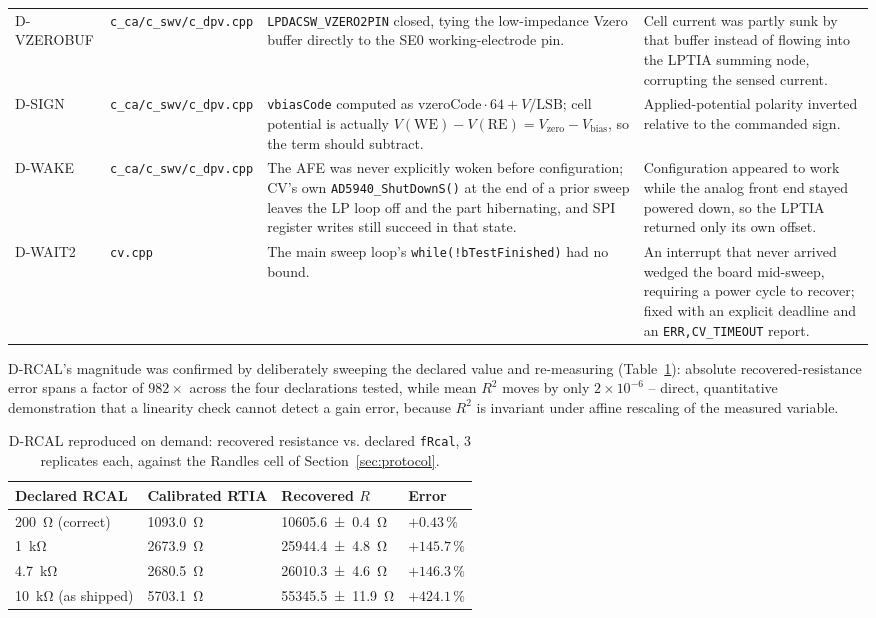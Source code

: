 \begin{table}[!t]
\begin{tabular}{@{}p{1.7cm}p{2.3cm}p{6.5cm}p{4.9cm}@{}}
D-VZEROBUF & \texttt{c\_ca/c\_swv/c\_dpv.cpp} & \texttt{LPDACSW\_VZERO2PIN}
  closed, tying the low-impedance Vzero buffer directly to the SE0
  working-electrode pin. & Cell current was partly sunk by that buffer
  instead of flowing into the LPTIA summing node, corrupting the sensed
  current. \\
D-SIGN & \texttt{c\_ca/c\_swv/c\_dpv.cpp} & \texttt{vbiasCode} computed as
  $\mathrm{vzeroCode}\cdot64+V/\mathrm{LSB}$; cell potential is actually
  $V(\mathrm{WE})-V(\mathrm{RE})=V_{\mathrm{zero}}-V_{\mathrm{bias}}$, so the
  term should subtract. & Applied-potential polarity inverted relative to
  the commanded sign. \\
D-WAKE & \texttt{c\_ca/c\_swv/c\_dpv.cpp} & The AFE was never explicitly
  woken before configuration; CV's own \texttt{AD5940\_ShutDownS()} at the
  end of a prior sweep leaves the LP loop off and the part hibernating,
  and SPI register writes still succeed in that state. & Configuration
  appeared to work while the analog front end stayed powered down, so the
  LPTIA returned only its own offset. \\
D-WAIT2 & \texttt{cv.cpp} & The main sweep loop's
  \texttt{while(!bTestFinished)} had no bound. & An interrupt that never
  arrived wedged the board mid-sweep, requiring a power cycle to recover;
  fixed with an explicit deadline and an \texttt{ERR,CV\_TIMEOUT} report. \\
\bottomrule
\end{tabular}
\end{table}

D-RCAL's magnitude was confirmed by deliberately sweeping the declared
value and re-measuring (Table~\ref{tab:rcalsweep}): absolute
recovered-resistance error spans a factor of $982\times$ across the four
declarations tested, while mean $R^2$ moves by only $2\times10^{-6}$ --
direct, quantitative demonstration that a linearity check cannot detect a
gain error, because $R^2$ is invariant under affine rescaling of the
measured variable.

\begin{table}[H]
\centering
\footnotesize
\setlength{\tabcolsep}{4pt}
\caption{D-RCAL reproduced on demand: recovered resistance vs. declared
\texttt{fRcal}, 3 replicates each, against the Randles cell of
Section~\ref{sec:protocol}.}
\label{tab:rcalsweep}
\begin{tabular}{@{}p{1.9cm}p{2.1cm}p{2.3cm}p{1.1cm}@{}}
\toprule
Declared RCAL & Calibrated RTIA & Recovered $R$ & Error \\
\midrule
\SI{200}{\ohm} (correct) & \SI{1093.0}{\ohm} & \SI{10605.6\pm0.4}{\ohm} & $+0.43\,\%$ \\
\SI{1}{\kilo\ohm} & \SI{2673.9}{\ohm} & \SI{25944.4\pm4.8}{\ohm} & $+145.7\,\%$ \\
\SI{4.7}{\kilo\ohm} & \SI{2680.5}{\ohm} & \SI{26010.3\pm4.6}{\ohm} & $+146.3\,\%$ \\
\SI{10}{\kilo\ohm} (as shipped) & \SI{5703.1}{\ohm} & \SI{55345.5\pm11.9}{\ohm} & $+424.1\,\%$ \\
\bottomrule
\end{tabular}
\end{table}

